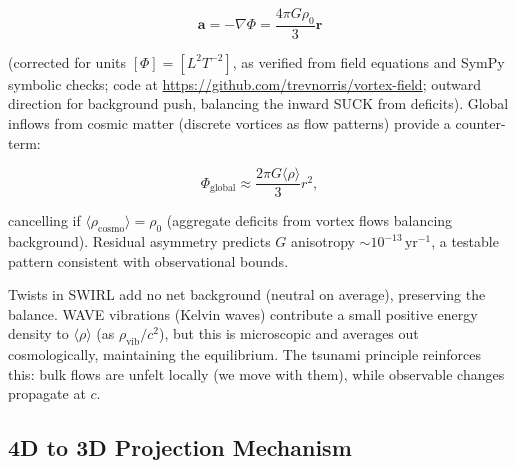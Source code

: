 \begin{equation}
\mathbf{a} = -\nabla \Phi = \frac{4\pi G \rho_0}{3} \mathbf{r}
\end{equation}

(corrected for units $[\Phi] = [L^2 T^{-2}]$, as verified from field equations and SymPy symbolic checks; code at \url{https://github.com/trevnorris/vortex-field}; outward direction for background push, balancing the inward SUCK from deficits). Global inflows from cosmic matter (discrete vortices as flow patterns) provide a counter-term:

\begin{equation}
\Phi_{\text{global}} \approx \frac{2\pi G \langle \rho \rangle}{3} r^2,
\end{equation}

cancelling if $\langle \rho_{\text{cosmo}} \rangle = \rho_0$ (aggregate deficits from vortex flows balancing background). Residual asymmetry predicts $G$ anisotropy $\sim 10^{-13} \,\mathrm{yr}^{-1}$, a testable pattern consistent with observational bounds.

Twists in SWIRL add no net background (neutral on average), preserving the balance. WAVE vibrations (Kelvin waves) contribute a small positive energy density to $\langle \rho \rangle$ (as $\rho_{\text{vib}} / c^2$), but this is microscopic and averages out cosmologically, maintaining the equilibrium. The tsunami principle reinforces this: bulk flows are unfelt locally (we move with them), while observable changes propagate at $c$.

\medskip

\subsection{4D to 3D Projection Mechanism}

